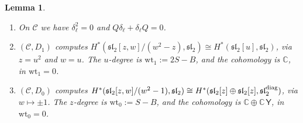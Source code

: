 \documentclass[11pt]{amsart}
\numberwithin{equation}{section}
\newtheorem{lemma}[theorem]{Lemma}
\theoremstyle{definition}
\theoremstyle{remark}
\newcommand{\C}{\mathbb{C}}
\newcommand{\sltwo}{\mathfrak{sl}_2}
\newcommand{\cC}{\mathcal{C}}
\newcommand{\Yc}{\mathsf{Y}}
\newcommand{\wt}{\mathrm{wt}}
\begin{document}
\begin{lemma}\label{lem:deformed}
\begin{enumerate}[label=(\roman*),leftmargin=2em]
\item On $\cC$ we have $\delta_\ell^2=0$ and $Q\delta_\ell+\delta_\ell Q=0$.
\item $(\cC,D_1)$ computes $H^*(\sltwo[z,w]/(w^2-z),\sltwo)\cong H^*(\sltwo[u],\sltwo)$, via $z=u^2$ and $w=u$. The $u$-degree is $\wt_1:=2S-B$, and the cohomology is $\C$, in $\wt_1=0$.
\item $(\cC,D_0)$ computes $H^*(\sltwo[z,w]/(w^2-1),\sltwo)\cong H^*(\sltwo[z]\oplus\sltwo[z],\sltwo^{\rm diag})$, via $w\mapsto\pm1$. The $z$-degree is $\wt_0:=S-B$, and the cohomology is $\C\oplus\C\,\Yc$, in $\wt_0=0$.
\end{enumerate}
\end{lemma}
\end{document}
